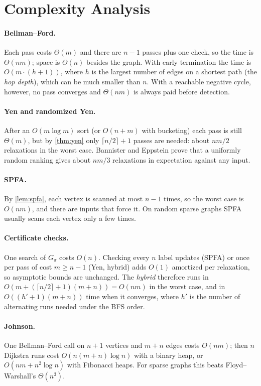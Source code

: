 \documentclass[11pt,a4paper]{article}
\theoremstyle{definition}
\newcommand{\pred}{\pi}
\begin{document}
\section{Complexity Analysis}

\paragraph{Bellman--Ford.} Each pass costs $\Theta(m)$ and there are $n-1$ passes plus one check, so the time is $\Theta(nm)$; space is $\Theta(n)$ besides the graph. With early termination the time is $O(m\cdot(h+1))$, where $h$ is the largest number of edges on a shortest path (the \emph{hop depth}), which can be much smaller than $n$. With a reachable negative cycle, however, no pass converges and $\Theta(nm)$ is always paid before detection.

\paragraph{Yen and randomized Yen.} After an $O(m\log m)$ sort (or $O(n+m)$ with bucketing) each pass is still $\Theta(m)$, but by \cref{thm:yen} only $\lceil n/2\rceil+1$ passes are needed: about $nm/2$ relaxations in the worst case. Bannister and Eppstein prove that a uniformly random ranking gives about $nm/3$ relaxations in expectation against any input.

\paragraph{SPFA.} By \cref{lem:spfa}, each vertex is scanned at most $n-1$ times, so the worst case is $O(nm)$, and there are inputs that force it. On random sparse graphs SPFA usually scans each vertex only a few times.

\paragraph{Certificate checks.} One search of $G_\pred$ costs $O(n)$. Checking every $n$ label updates (SPFA) or once per pass of cost $m\ge n-1$ (Yen, hybrid) adds $O(1)$ amortized per relaxation, so asymptotic bounds are unchanged. The \emph{hybrid} therefore runs in $O(m + (\lceil n/2\rceil+1)(m+n)) = O(nm)$ in the worst case, and in $O((h'+1)(m+n))$ time when it converges, where $h'$ is the number of alternating runs needed under the BFS order.

\paragraph{Johnson.} One Bellman--Ford call on $n+1$ vertices and $m+n$ edges costs $O(nm)$; then $n$ Dijkstra runs cost $O(n(m+n)\log n)$ with a binary heap, or $O(nm+n^2\log n)$ with Fibonacci heaps. For sparse graphs this beats Floyd--Warshall's $\Theta(n^3)$.
\end{document}
